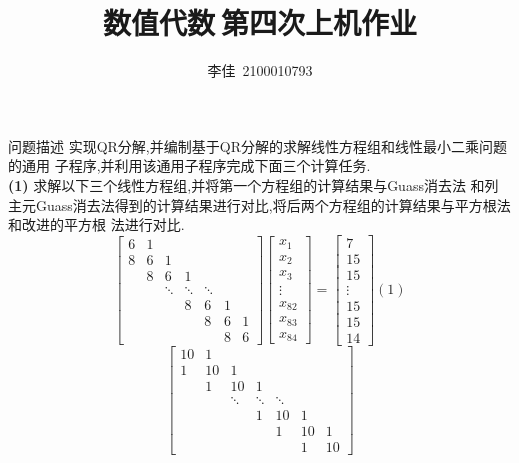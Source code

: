 \documentclass{article}
\title{数值代数$\ $第四次上机作业}
\author{李佳~2100010793}
\date{}
\begin{document}
\maketitle
\begin{section}{问题描述}
    实现QR分解,并编制基于QR分解的求解线性方程组和线性最小二乘问题的通用
    子程序,并利用该通用子程序完成下面三个计算任务.\\

    \noindent\textbf{(1)} 求解以下三个线性方程组,并将第一个方程组的计算结果与Guass消去法
    和列主元Guass消去法得到的计算结果进行对比,将后两个方程组的计算结果与平方根法和改进的平方根
    法进行对比.
    $$ \begin{bmatrix}
        6 & 1 &  &  & & & \\
        8 & 6 & 1 & & & &\\
         & 8 & 6 & 1 & & &\\
         & & \ddots & \ddots & \ddots& &\\
         & & & 8 & 6 & 1 & \\
         & & & & 8 & 6 & 1 \\
         & & & &  & 8 & 6 
    \end{bmatrix}
    \begin{bmatrix}
        x_1\\ x_2 \\ x_3 \\ \vdots \\ x_{82}\\x_{83}\\x_{84}
    \end{bmatrix}=
    \begin{bmatrix}
        7 \\ 15 \\ 15 \\ \vdots \\ 15 \\ 15 \\14
    \end{bmatrix}(1)
    $$
    $$ \begin{bmatrix}
        10 & 1 &  &  & & & \\
        1 & 10 & 1 & & & &\\
         & 1 & 10 & 1 & & &\\
         & & \ddots & \ddots & \ddots& &\\
         & & & 1 & 10 & 1 & \\
         & & & & 1 & 10 & 1 \\
         & & & &  & 1 & 10 
    \end{bmatrix}
$$
\end{section}
\end{document}
